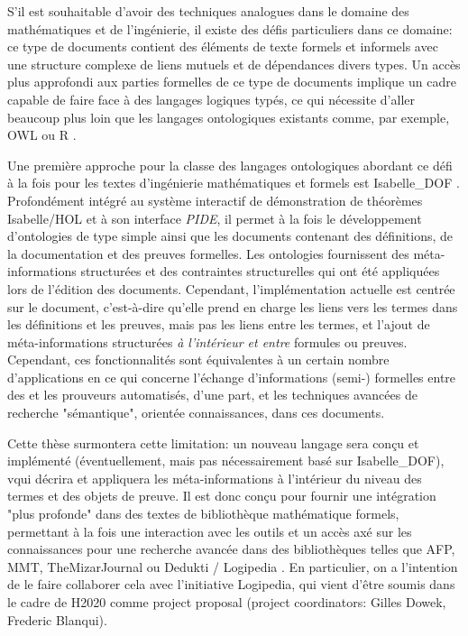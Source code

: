 \documentclass[a4paper,10pt]{article}
\begin{document}
S'il est souhaitable d'avoir des techniques analogues
dans le domaine des mathématiques et de l'ingénierie,
il existe des défis particuliers dans ce domaine:
ce type de documents contient des éléments de texte formels et informels
avec une structure complexe de liens mutuels et de dépendances divers types.
Un accès plus approfondi aux parties formelles de ce type de documents implique
un cadre capable de faire face à des langages logiques typés,
ce qui nécessite d'aller beaucoup plus loin
que les langages ontologiques existants
comme, par exemple, OWL ou R \cite {owl2012,protege,owlgred,rontorium}.

Une première approche pour la classe des langages ontologiques abordant ce défi
à la fois pour les textes d'ingénierie mathématiques et formels est
Isabelle\_DOF
\cite{Brucker-ea.Using-CICM18,BruckerWolff.Design-SEFM19,BruckerWolff.Certif-IFM19}.
Profondément intégré
au système interactif de démonstration de théorèmes Isabelle/HOL
et à son interface \emph{PIDE},
il permet à la fois le développement d'ontologies de type simple
ainsi que les documents contenant des définitions, de la documentation
et des preuves formelles.
Les ontologies fournissent des méta-informations structurées
et des contraintes structurelles
qui ont été appliquées lors de l'édition des documents.
Cependant, l'implémentation actuelle est centrée sur le document,
c'est-à-dire qu'elle prend en charge les liens vers les termes
dans les définitions et les preuves,
mais pas les liens entre les termes,
et l'ajout de méta-informations structurées
\emph{à l'intérieur et entre} formules ou preuves.
Cependant, ces fonctionnalités sont
équivalentes à un certain nombre d'applications
en ce qui concerne l'échange d'informations (semi-) formelles
entre des et les prouveurs automatisés, d'une part,
et les techniques avancées de recherche "sémantique", orientée connaissances,
dans ces documents.

Cette thèse surmontera cette limitation:
un nouveau langage sera conçu et implémenté
(éventuellement, mais pas nécessairement basé sur Isabelle\_DOF),
vqui décrira et appliquera les méta-informations
à l'intérieur du niveau des termes et des objets de preuve.
Il est donc conçu pour fournir une intégration "plus profonde"
dans des textes de bibliothèque mathématique formels,
permettant à la fois une interaction avec les outils
et un accès axé sur les connaissances
pour une recherche avancée dans des bibliothèques
telles que AFP, MMT, TheMizarJournal ou Dedukti / Logipedia
\cite {afp,mmt,TheMizarJournal,dedukti}.
En particulier, on a l'intention de le faire collaborer cela
avec l'initiative Logipedia,
qui vient d'être soumis dans le cadre de H2020 comme project proposal
(project coordinators: Gilles Dowek, Frederic Blanqui).
\end{document}
